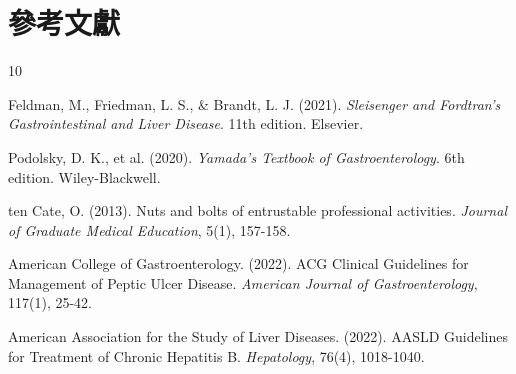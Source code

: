 \documentclass[12pt,a4paper]{article}
\begin{document}
\section{參考文獻}
\begin{thebibliography}{10}

Feldman, M., Friedman, L. S., \& Brandt, L. J. (2021). \textit{Sleisenger and Fordtran's Gastrointestinal and Liver Disease}. 11th edition. Elsevier.

Podolsky, D. K., et al. (2020). \textit{Yamada's Textbook of Gastroenterology}. 6th edition. Wiley-Blackwell.

ten Cate, O. (2013). Nuts and bolts of entrustable professional activities. \textit{Journal of Graduate Medical Education}, 5(1), 157-158.

American College of Gastroenterology. (2022). ACG Clinical Guidelines for Management of Peptic Ulcer Disease. \textit{American Journal of Gastroenterology}, 117(1), 25-42.

American Association for the Study of Liver Diseases. (2022). AASLD Guidelines for Treatment of Chronic Hepatitis B. \textit{Hepatology}, 76(4), 1018-1040.

\end{thebibliography}
\end{document}
